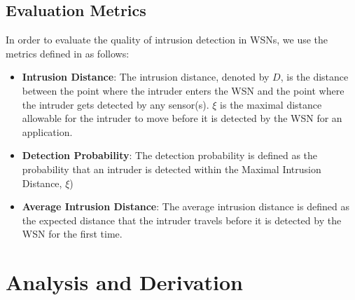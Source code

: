 \documentclass[10pt, conference, compsocconf, twocolumn]{IEEEtran}
\begin{document}
%


\subsection{Evaluation Metrics}
In order to evaluate the quality of intrusion detection in WSNs, we
use the metrics defined in \cite{Intru_TMC} as follows:
\begin{itemize}
  \item \textbf{Intrusion Distance}: The intrusion distance, denoted by
$D$, is the distance between the point where the intruder enters the
WSN and the point where the intruder gets detected by any sensor(s).
$\xi$ is the maximal distance allowable for the intruder to move
before it is detected by the WSN for an application.


  \item \textbf{Detection Probability}: The detection probability is defined as
the probability that an intruder is detected within the Maximal
Intrusion Distance, $\xi$)
 \item \textbf{Average Intrusion Distance}: The average intrusion distance is
defined as the expected distance that the intruder travels before it
is detected by the WSN for the first time.\\
\end{itemize}


\section{Analysis and Derivation}\label{sec:intr_detection_analysis}
\end{document}
